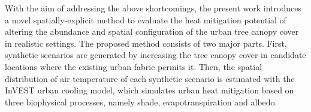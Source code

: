 \documentclass[10pt,letterpaper]{article}
\begin{document}
With the aim of addressing the above shortcomings, the present work introduces a novel spatially-explicit method to evaluate the heat mitigation potential of altering the abundance and spatial configuration of the urban tree canopy cover in realistic settings.
The proposed method consists of two major parts.
First, synthetic scenarios are generated by increasing the tree canopy cover in candidate locations where the existing urban fabric permits it. %
Then, the spatial distribution of air temperature of each synthetic scenario is estimated with the InVEST urban cooling model, which simulates urban heat mitigation based on three biophysical processes, namely shade, evapotranspiration and albedo. %
\end{document}
